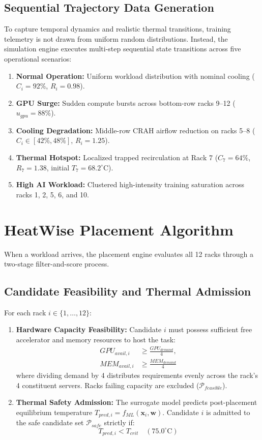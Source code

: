 \documentclass[conference,10pt]{IEEEtran}
\begin{document}
\subsection{Sequential Trajectory Data Generation}
To capture temporal dynamics and realistic thermal transitions, training telemetry is not drawn from uniform random distributions. Instead, the simulation engine executes multi-step sequential state transitions across five operational scenarios:
\begin{enumerate}
    \item \textbf{Normal Operation:} Uniform workload distribution with nominal cooling ($C_i = 92\%$, $R_i = 0.98$).
    \item \textbf{GPU Surge:} Sudden compute bursts across bottom-row racks 9--12 ($u_{gpu} = 88\%$).
    \item \textbf{Cooling Degradation:} Middle-row CRAH airflow reduction on racks 5--8 ($C_i \in [42\%, 48\%]$, $R_i = 1.25$).
    \item \textbf{Thermal Hotspot:} Localized trapped recirculation at Rack 7 ($C_7 = 64\%$, $R_7 = 1.38$, initial $T_7 = 68.2^\circ\text{C}$).
    \item \textbf{High AI Workload:} Clustered high-intensity training saturation across racks 1, 2, 5, 6, and 10.
\end{enumerate}

\section{HeatWise Placement Algorithm}
\label{sec:algorithm}
When a workload arrives, the placement engine evaluates all 12 racks through a two-stage filter-and-score process.

\subsection{Candidate Feasibility and Thermal Admission}
For each rack $i \in \{1, \dots, 12\}$:
\begin{enumerate}
    \item \textbf{Hardware Capacity Feasibility:} Candidate $i$ must possess sufficient free accelerator and memory resources to host the task:
    \begin{equation}
    \begin{split}
    GPU_{avail,i} &\ge \frac{GPU_{demand}}{4}, \\
    MEM_{avail,i} &\ge \frac{MEM_{demand}}{4}
    \end{split}
    \end{equation}
    where dividing demand by 4 distributes requirements evenly across the rack's 4 constituent servers. Racks failing capacity are excluded ($\mathcal{P}_{feasible}$).
    \item \textbf{Thermal Safety Admission:} The surrogate model predicts post-placement equilibrium temperature $T_{pred,i} = f_{ML}(\mathbf{x}_i, \mathbf{w})$. Candidate $i$ is admitted to the safe candidate set $\mathcal{P}_{safe}$ strictly if:
    \begin{equation}
    T_{pred,i} < T_{crit} \quad (75.0^\circ\text{C})
    \end{equation}
\end{enumerate}
\end{document}
